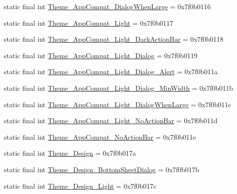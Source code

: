 \begin{CompactItemize}
\item 
static final int \hyperlink{classandroid_1_1support_1_1graphics_1_1drawable_1_1_r_1_1style_05fb86bc3d5931eb3c1c4fb44d98d856}{Theme\_\-AppCompat\_\-DialogWhenLarge} = 0x7f0b0116
\item 
static final int \hyperlink{classandroid_1_1support_1_1graphics_1_1drawable_1_1_r_1_1style_81cbcb4eeb12e994f8e806b858abeec7}{Theme\_\-AppCompat\_\-Light} = 0x7f0b0117
\item 
static final int \hyperlink{classandroid_1_1support_1_1graphics_1_1drawable_1_1_r_1_1style_0b7b22599388312cb72414a5054a31ff}{Theme\_\-AppCompat\_\-Light\_\-DarkActionBar} = 0x7f0b0118
\item 
static final int \hyperlink{classandroid_1_1support_1_1graphics_1_1drawable_1_1_r_1_1style_28c4fedf08cfd039994a09e6239b1072}{Theme\_\-AppCompat\_\-Light\_\-Dialog} = 0x7f0b0119
\item 
static final int \hyperlink{classandroid_1_1support_1_1graphics_1_1drawable_1_1_r_1_1style_c157019f31e307bdfb56f53003083a81}{Theme\_\-AppCompat\_\-Light\_\-Dialog\_\-Alert} = 0x7f0b011a
\item 
static final int \hyperlink{classandroid_1_1support_1_1graphics_1_1drawable_1_1_r_1_1style_2b68f8ba34df300fa28a4428b0a70d0a}{Theme\_\-AppCompat\_\-Light\_\-Dialog\_\-MinWidth} = 0x7f0b011b
\item 
static final int \hyperlink{classandroid_1_1support_1_1graphics_1_1drawable_1_1_r_1_1style_189c1ddebc84a787a692bdaad201126c}{Theme\_\-AppCompat\_\-Light\_\-DialogWhenLarge} = 0x7f0b011c
\item 
static final int \hyperlink{classandroid_1_1support_1_1graphics_1_1drawable_1_1_r_1_1style_1ed11b5bb1412338b7224f1554033e2f}{Theme\_\-AppCompat\_\-Light\_\-NoActionBar} = 0x7f0b011d
\item 
static final int \hyperlink{classandroid_1_1support_1_1graphics_1_1drawable_1_1_r_1_1style_de5e725511e49f1cce2775de64b53d76}{Theme\_\-AppCompat\_\-NoActionBar} = 0x7f0b011e
\item 
static final int \hyperlink{classandroid_1_1support_1_1graphics_1_1drawable_1_1_r_1_1style_9587cb50cf5978240f6b1377ac8074da}{Theme\_\-Design} = 0x7f0b017a
\item 
static final int \hyperlink{classandroid_1_1support_1_1graphics_1_1drawable_1_1_r_1_1style_70de806e3af9258f39f818b61095de69}{Theme\_\-Design\_\-BottomSheetDialog} = 0x7f0b017b
\item 
static final int \hyperlink{classandroid_1_1support_1_1graphics_1_1drawable_1_1_r_1_1style_41a0e031be790ef7cf94582aa01db6ec}{Theme\_\-Design\_\-Light} = 0x7f0b017c

\end{CompactItemize}
